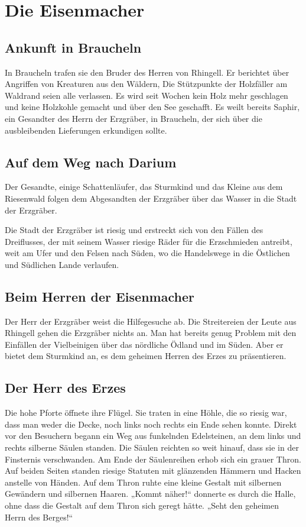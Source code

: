 \chapter{Die Eisenmacher}
\section{Ankunft in Braucheln}
In Braucheln trafen sie den Bruder des Herren von Rhingell. Er berichtet über Angriffen von Kreaturen aus den Wäldern, Die Stützpunkte der Holzfäller am Waldrand seien alle verlassen. Es wird seit Wochen kein Holz mehr geschlagen und keine Holzkohle gemacht und über den See geschafft. Es weilt bereits Saphir, ein Gesandter des Herrn der Erzgräber, in Braucheln, der sich über die ausbleibenden Lieferungen erkundigen sollte.

\section{Auf dem Weg nach Darium}
Der Gesandte, einige Schattenläufer, das Sturmkind und das Kleine aus dem Riesenwald folgen dem Abgesandten der Erzgräber über das Wasser in die Stadt der Erzgräber.

Die Stadt der Erzgräber ist riesig und erstreckt sich von den Fällen des Dreiflusses, der mit seinem Wasser riesige Räder für die Erzschmieden antreibt, weit am Ufer und den Felsen nach Süden, wo die Handelswege in die Östlichen und Südlichen Lande verlaufen.

\section{Beim Herren der Eisenmacher}
Der Herr der Erzgräber weist die Hilfegesuche ab. Die Streitereien der Leute aus Rhingell gehen die Erzgräber nichts an. Man hat bereits genug Problem mit den Einfällen der Vielbeinigen über das nördliche Ödland und im Süden. Aber er bietet dem Sturmkind an, es dem geheimen Herren des Erzes zu präsentieren.

\section{Der Herr des Erzes}
Die hohe Pforte öffnete ihre Flügel. Sie traten in eine Höhle, die so riesig war, dass man weder die Decke, noch links noch rechts ein Ende sehen konnte. Direkt vor den Besuchern begann ein Weg aus funkelnden Edelsteinen, an dem links und rechts silberne Säulen standen. Die Säulen reichten so weit hinauf, dass sie in der Finsternis verschwanden.
Am Ende der Säulenreihen erhob sich ein grauer Thron. Auf beiden Seiten standen riesige Statuten mit glänzenden Hämmern und Hacken anstelle von Händen. Auf dem Thron ruhte eine kleine Gestalt mit silbernen Gewändern und silbernen Haaren. „Kommt näher!“ donnerte es durch die Halle, ohne dass die Gestalt auf dem Thron sich geregt hätte. „Seht den geheimen Herrn des Berges!“ 

